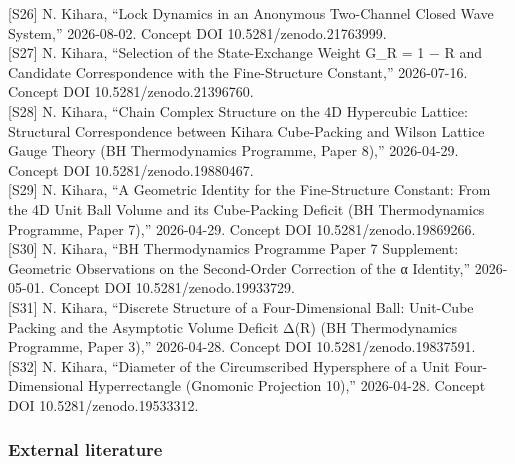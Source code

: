 \documentclass[
  a4paper,
]{article}
\begin{document}
{[}S26{]} N. Kihara, ``Lock Dynamics in an Anonymous Two-Channel Closed
Wave System,'' 2026-08-02. Concept DOI 10.5281/zenodo.21763999.\\
{[}S27{]} N. Kihara, ``Selection of the State-Exchange Weight G\_R = 1 −
R and Candidate Correspondence with the Fine-Structure Constant,''
2026-07-16. Concept DOI 10.5281/zenodo.21396760.\\
{[}S28{]} N. Kihara, ``Chain Complex Structure on the 4D Hypercubic
Lattice: Structural Correspondence between Kihara Cube-Packing and
Wilson Lattice Gauge Theory (BH Thermodynamics Programme, Paper 8),''
2026-04-29. Concept DOI 10.5281/zenodo.19880467.\\
{[}S29{]} N. Kihara, ``A Geometric Identity for the Fine-Structure
Constant: From the 4D Unit Ball Volume and its Cube-Packing Deficit (BH
Thermodynamics Programme, Paper 7),'' 2026-04-29. Concept DOI
10.5281/zenodo.19869266.\\
{[}S30{]} N. Kihara, ``BH Thermodynamics Programme Paper 7 Supplement:
Geometric Observations on the Second-Order Correction of the α
Identity,'' 2026-05-01. Concept DOI 10.5281/zenodo.19933729.\\
{[}S31{]} N. Kihara, ``Discrete Structure of a Four-Dimensional Ball:
Unit-Cube Packing and the Asymptotic Volume Deficit Δ(R) (BH
Thermodynamics Programme, Paper 3),'' 2026-04-28. Concept DOI
10.5281/zenodo.19837591.\\
{[}S32{]} N. Kihara, ``Diameter of the Circumscribed Hypersphere of a
Unit Four-Dimensional Hyperrectangle (Gnomonic Projection 10),''
2026-04-28. Concept DOI 10.5281/zenodo.19533312.

\subsubsection{External literature}\label{external-literature}
\end{document}
